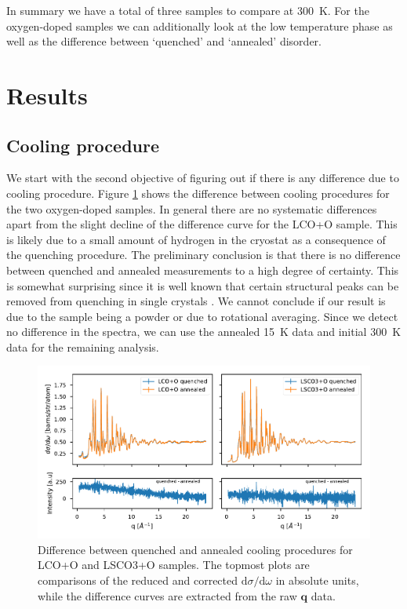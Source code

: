 In summary we have a total of three samples to compare at \SI{300}{\kelvin}. For the oxygen-doped samples we can additionally look at the low temperature phase as well as the difference between `quenched' and `annealed' disorder.

\section{Results}

\subsection{Cooling procedure}
We start with the second objective of figuring out if there is any difference due to cooling procedure. Figure \ref{fig:difference} shows the difference between cooling procedures for the two oxygen-doped samples. In general there are no systematic differences apart from the slight decline of the difference curve for the LCO+O sample. This is likely due to a small amount of hydrogen in the cryostat as a consequence of the quenching procedure. The preliminary conclusion is that there is no difference between quenched and annealed measurements to a high degree of certainty. This is somewhat surprising since it is well known that certain structural peaks can be removed from quenching in single crystals \cite{Poccia2012}. We cannot conclude if our result is due to the sample being a powder or due to rotational averaging. Since we detect no difference in the spectra, we can use the annealed \SI{15}{\kelvin} data and initial \SI{300}{\kelvin} data for the remaining analysis.


\begin{figure}
    \centering
    \includegraphics[width=\textwidth]{fig/pdf/quenched_annealed.pdf}
    \caption{Difference between quenched and annealed cooling procedures for LCO+O and LSCO3+O samples. The topmost plots are comparisons of the reduced and corrected $\text{d}\sigma/\text{d}\omega$ in absolute units, while the difference curves are extracted from the raw $\bm{q}$ data.}
    \label{fig:difference}
\end{figure}

